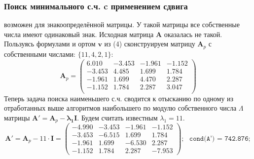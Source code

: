 \subsubsection{Поиск минимального с.ч. c применением сдвига}
возможен для знакоопределённой матрицы. У такой матрицы все собственные числа имеют одинаковый знак. Исходная матрица $\mathbf{A}$ оказалась не такой. Пользуясь формулами и ортом $\mathbf{v}$ из (4) сконструируем матрицу $\mathbf{A}_p$ с собственными числами: $\{11,4,2,1\}$:
\begin{equation}
    \mathbf{A}_p =
    \begin{pmatrix}
         6.010& -3.453& -1.961& -1.152\\
        -3.453&  4.485&  1.699&  1.784\\
        -1.961&  1.699&  4.470&  2.287\\
        -1.152&  1.784&  2.287&  3.047\\
    \end{pmatrix}
\end{equation}
Теперь задача поиска наименьшего с.ч. сводится к отысканию по одному из отработанных выше алгоритмов наибольшего по модулю собственного числа $\Lambda$ матрицы $ \mathbf{A' = A}_p-\mathbf{\lambda_1I}$. Будем считать известным $\lambda_1=11$.
\begin{equation}
    \mathbf{A' = A}_p-11\cdot\mathbf{I} =
    \begin{pmatrix}
        -4.990& -3.453& -1.961& -1.152\\
        -3.453& -6.515&  1.699&  1.784\\
        -1.961&  1.699& -6.530&  2.287\\
        -1.152&  1.784&  2.287& -7.953
    \end{pmatrix}; ~~~ \texttt{cond(A') = 742.876};
\end{equation}

